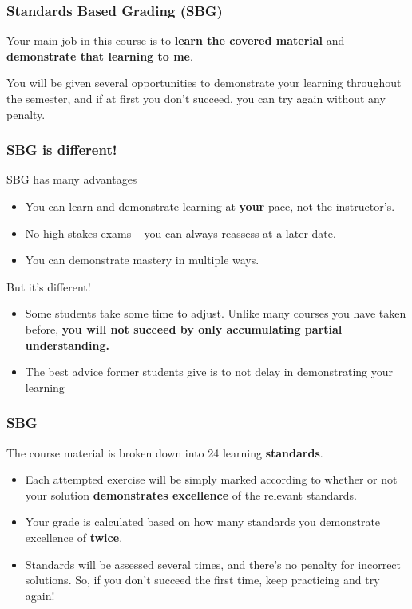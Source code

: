 \documentclass[aspectration=1610]{beamer}
\begin{document}
\begin{frame}\frametitle{Standards Based Grading (SBG)}
Your main job in this course is to \textbf{learn the covered material}
and \textbf{demonstrate that learning to me}.

\vspace{0.2in}
\pause

You will be given several opportunities to demonstrate your learning throughout
the semester, and if
at first you don't succeed, you can try again without any penalty.
\end{frame}

\begin{frame}\frametitle{SBG is different!}
SBG has many advantages
\begin{itemize}
\item You can learn and demonstrate learning at \textbf{your} pace, not the instructor's.
\item No high stakes exams -- you can always reassess at a later date.
\item You can demonstrate mastery in multiple ways.
\end{itemize}
\vfill
But it's different!
\begin{itemize}
\item Some students take some time to adjust.  Unlike many courses you have taken before, \textbf{you will not succeed by only accumulating partial understanding.}
\item The best advice former students give is to not delay in demonstrating your learning
\end{itemize}
\end{frame}




\begin{frame}\frametitle{SBG}
The course material is broken down into 24 learning \textbf{standards}.
\begin{itemize}
\item Each attempted exercise will be simply marked according to whether or not
      your solution \textbf{demonstrates excellence} of the relevant standards.
\item Your grade is calculated based on how many standards you demonstrate excellence of \textbf{twice}.
\item Standards will be assessed several times, and there's no penalty for
      incorrect solutions. So, if you don't succeed the first time,
      keep practicing and try again!
\end{itemize}
\end{frame}
\end{document}
